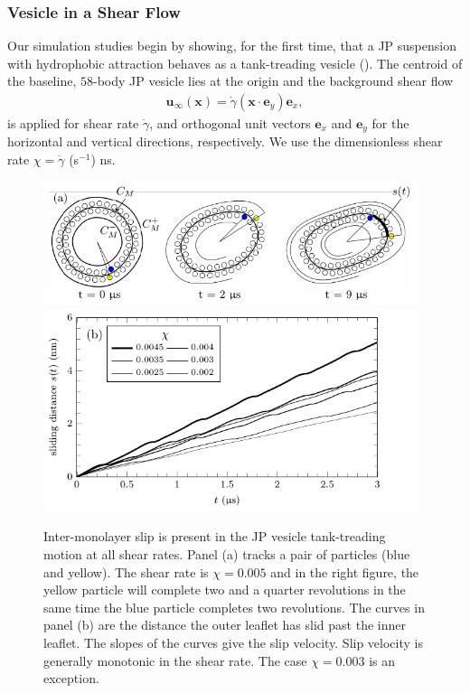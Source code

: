 \documentclass[lineno]{jfm}
\newcommand{\xx}{\mathbf{x}}
\newcommand{\uu}{\mathbf{u}}
\begin{document}
\subsubsection{Vesicle in a Shear Flow}
\label{sec:ves_in_shear}
Our simulation studies begin by showing, for the first time, that a JP
suspension with hydrophobic attraction behaves as a tank-treading
vesicle (\cite{Finken08, Shaqfeh11}). The centroid of the baseline,
$58$-body JP vesicle lies at the origin and the background shear flow 
\begin{align}
  \uu_{\infty}(\xx) = \dot\gamma (\xx \cdot \mathbf{e}_y) \mathbf{e}_x,
\end{align} 
is applied for shear rate $\dot\gamma$, and orthogonal unit vectors
$\mathbf{e}_x$ and $\mathbf{e}_y$ for the horizontal and vertical
directions, respectively. We use the dimensionless shear rate $\chi =
\dot \gamma$ (s$^{-1}$) ns.

\begin{figure}
\begin{center}
  \includegraphics[width=11cm]{Figure5_Wrapper.pdf}\\
  \includegraphics[width=11cm]{Figure5B_Wrapper.pdf}
\end{center} 
\caption{\label{figure5} Inter-monolayer slip is present in the JP
  vesicle tank-treading motion at all shear rates. Panel (a) tracks a
  pair of particles (blue and yellow). The shear rate is $\chi=0.005$
  and in the right figure, the yellow particle will complete two and a
  quarter revolutions in the same time the blue particle completes two
  revolutions. The curves in panel (b) are the distance the outer
  leaflet has slid past the inner leaflet. The slopes of the curves
  give the slip velocity. 
  Slip velocity is generally monotonic in the shear rate.
  The case $\chi = 0.003$ is an exception.}
\end{figure}
\end{document}
